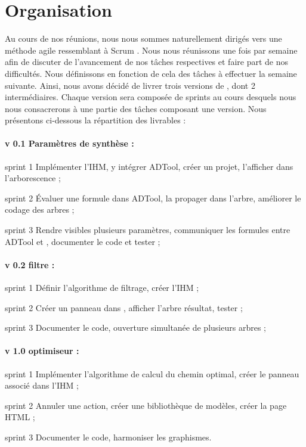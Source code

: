 \section{Organisation}
	\label{sec:livrables}

	Au cours de nos réunions, nous nous sommes naturellement dirigés vers une méthode agile ressemblant à \og Scrum \fg. Nous nous réunissons une fois par semaine afin de discuter de l'avancement de nos tâches respectives et faire part de nos difficultés. Nous définissons en fonction de cela des tâches à effectuer la semaine suivante. Ainsi, nous avons décidé de livrer trois versions de \glasir{}, dont 2 intermédiaires.
	Chaque version sera composée de sprints au cours desquels nous nous consacrerons à une partie des tâches composant une version.
	Nous présentons ci-dessous la répartition des livrables :
	
	\paragraph{v 0.1 Paramètres de synthèse :}
		\begin{description}
			\item{sprint 1} Implémenter l'IHM, y intégrer ADTool, créer un projet, l'afficher dans l'arborescence ;
			\item{sprint 2} Évaluer une formule dans ADTool, la propager dans l'arbre, améliorer le codage des arbres ;
			\item{sprint 3} Rendre visibles plusieurs paramètres, communiquer les formules entre ADTool et \glasir{}, documenter le code et tester ;
		\end{description}
	\paragraph{v 0.2 filtre :} 
		\begin{description}
			\item{sprint 1} Définir l'algorithme de filtrage, créer l'IHM ;
			\item{sprint 2} Créer un panneau dans \glasir{}, afficher l'arbre résultat, tester ;
			\item{sprint 3} Documenter le code, ouverture simultanée de plusieurs arbres ;
		\end{description}
	\paragraph{v 1.0 optimiseur : }
		\begin{description}
			\item{sprint 1} Implémenter l'algorithme de calcul du chemin optimal, créer le panneau associé dans l'IHM ;
			\item{sprint 2} Annuler une action, créer une bibliothèque de modèles, créer la page HTML ;
			\item{sprint 3} Documenter le code, harmoniser les graphismes.
		\end{description}
	


